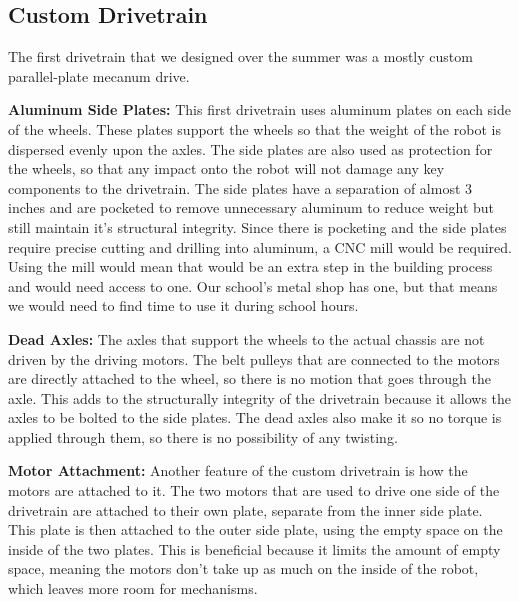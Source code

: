 

\subsection{Custom Drivetrain}
\par The first drivetrain that we designed over the summer was a mostly custom parallel-plate mecanum drive.


\par \textbf{Aluminum Side Plates:} This first drivetrain uses aluminum plates on each side of the wheels. These plates support the wheels so that the weight of the robot is dispersed evenly upon the axles. The side plates are also used as protection for the wheels, so that any impact onto the robot will not damage any key components to the drivetrain. The side plates have a separation of almost 3 inches and are pocketed to remove unnecessary aluminum to reduce weight but still maintain it's structural integrity. Since there is pocketing and the side plates require precise cutting and drilling into aluminum, a CNC mill would be required. Using the mill would mean that would be an extra step in the building process and would need access to one. Our school's metal shop has one, but that means we would need to find time to use it during school hours.


\par \textbf{Dead Axles:} The axles that support the wheels to the actual chassis are not driven by the driving motors. The belt pulleys that are connected to the motors are directly attached to the wheel, so there is no motion that goes through the axle. This adds to the structurally integrity of the drivetrain because it allows the axles to be bolted to the side plates. The dead axles also make it so no torque is applied through them, so there is no possibility of any twisting.


\par \textbf{Motor Attachment:} Another feature of the custom drivetrain is how the motors are attached to it. The two motors that are used to drive one side of the drivetrain are attached to their own plate, separate from the inner side plate. This plate is then attached to the outer side plate, using the empty space on the inside of the two plates. This is beneficial because it limits the amount of empty space, meaning the motors don't take up as much on the inside of the robot, which leaves more room for mechanisms.

